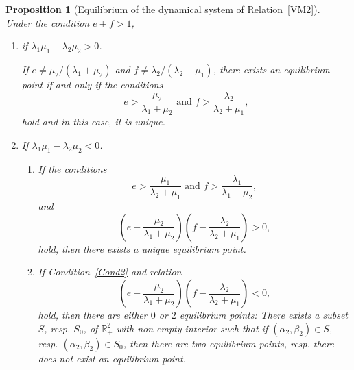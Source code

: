 \documentclass[10pt,a4paper]{amsart}
\newtheorem{proposition}{Proposition}
\newcommand{\R}{\ensuremath{\mathbb{R}}}
\begin{document}
\begin{proposition}[Equilibrium of the dynamical system of Relation~\eqref{VM2}]\label{M2ExFP}\ \\
Under the condition $e{+}f>1$,
\begin{enumerate}
\item if $\lambda_1\mu_1{-}\lambda_2\mu_2>0$.

\medskip
\noindent  If $e{\not=}\mu_2/(\lambda_1{+}\mu_2)$ and $f{\not=}\lambda_2/(\lambda_2{+}\mu_1)$,
there exists an equilibrium point if and only if the conditions
\begin{equation}\label{Cond21}
e > \frac{\mu_2}{\lambda_1{+}\mu_2} \text{ and }   f >\frac{\lambda_2}{\lambda_2{+}\mu_1},
\end{equation}
hold and in this case, it is unique. 
\item If $\lambda_1\mu_1{-}\lambda_2\mu_2<0$.\medskip
  \begin{enumerate}
  \item If the conditions
\begin{equation}\label{Cond2}
e > \frac{\mu_1}{\lambda_2{+}\mu_1} \text{ and }   f >\frac{\lambda_1}{\lambda_1{+}\mu_2},
\end{equation}
and 
\begin{equation}\label{Cond3}
\left(e{-}\frac{\mu_2}{\lambda_1{+}\mu_2}\right)\left(f {-}\frac{\lambda_2}{\lambda_2{+}\mu_1}\right) > 0,
\end{equation}
hold, then there exists a unique equilibrium point.
\item If Condition~\eqref{Cond2}
and relation
\begin{equation}\label{Cond32}
\left(e{-}\frac{\mu_2}{\lambda_1{+}\mu_2}\right)\left(f {-}\frac{\lambda_2}{\lambda_2{+}\mu_1}\right) < 0,
\end{equation}
hold, then there are  either $0$ or $2$ equilibrium points: There exists a subset $S$, resp. $S_0$, of $\R_+^2$ with non-empty interior such that if $(\alpha_2,\beta_2){\in}S$, resp. $(\alpha_2,\beta_2){\in}S_0$, then there are two equilibrium points, resp. there does not exist an equilibrium point. 
\end{enumerate}
\end{enumerate}
\end{proposition}
\end{document}
